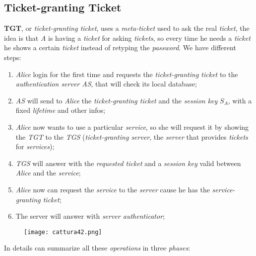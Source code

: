 \documentclass{article}
\begin{document}
\subsection{Ticket-granting Ticket}
\textbf{TGT}, or \emph{ticket-granting ticket}, uses a \emph{meta-ticket} used to ask the real \emph{ticket}, the idea is that\emph{ A} is having a \emph{ticket} for asking \emph{tickets}, so every time he needs a \emph{ticket} he shows a certain \emph{ticket} instead of retyping the \emph{password}. We have different steps:
\begin{enumerate}
\item \emph{Alice} login for the first time and requests the \emph{ticket-granting ticket} to the \emph{authentication server AS}, that will check its local database;
\item \emph{AS} will send to \emph{Alice} the \emph{ticket-granting ticket} and the \emph{session key }$S_A$, with a fixed \emph{lifetime} and other infos;
\item \emph{Alice} now wants to use a particular \emph{service}, so she will request it by showing the \emph{TGT} to the \emph{TGS} (\emph{ticket-granting server}, the \emph{server} that provides \emph{tickets} for \emph{services});
\item \emph{TGS} will answer with the \emph{requested ticket} and a \emph{session key} valid between\emph{ Alice} and the \emph{service};
\item \emph{Alice} now can request the \emph{service} to the \emph{server} cause he has the \emph{service-granting ticket};
\item The server will answer with \emph{server authenticator}; 
\end{enumerate}
\begin{figure}[H]
  \centering
  \texttt{[image: cattura42.png]}
\end{figure}
In details can summarize all these \emph{operations} in three \emph{phases}:
\end{document}
